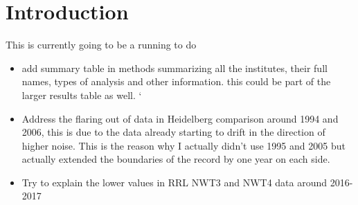 \newpage
\section{Introduction}
This is currently going to be a running to do 
\begin{itemize}
	\item add summary table in methods summarizing all the institutes, their full names, types of analysis and other information. this could be part of the larger results table as well. `
	\item Address the flaring out of data in Heidelberg comparison around 1994 and 2006, this is due to the data already starting to drift in the direction of higher noise. This is the reason why I actually didn't use 1995 and 2005 but actually extended the boundaries of the record by one year on each side. 
	\item Try to explain the lower values in RRL NWT3 and NWT4 data around 2016-2017
\end{itemize}